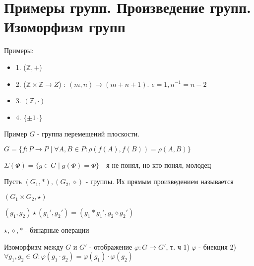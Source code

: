 
\section{Примеры групп. Произведение групп. Изоморфизм групп}
Примеры:
\begin{itemize}
\item[] 1. ($\mathbb{Z}, +$)
\item[] 2. ($\mathbb{Z}\times \mathbb{Z} \to Z$) : $(m, n) \to (m+n+1)$. $e=1, n^{-1}=n-2$
\item[] 3. $(\mathbb{Z}, \cdot)$
\item[] 4. $\{\pm 1\, \cdot \}$
\end{itemize}

Пример $G$ - группа перемещений плоскости.

$G = \{f: P \to P \mid \forall A, B \in P : \rho (f(A), f(B)) = \rho(A, B)\}$

$\Sigma(\Phi) = \{g \in G \mid g(\Phi) = \Phi\}$ - я не понял, но кто понял, молодец

\begin{conj}
    Пусть $(G_1, *), (G_2, \diamond)$ - группы. Их прямым произведением называется
    
    $(G_1\times G_2, \star)$
    
    $(g_1, g_2)\star (g_1', g_2') = (g_1*g_1', g_2\diamond g_2')$
    
$\star, \diamond, *$ - бинарные операции
\end{conj}
\begin{conj}
    Изоморфизм между $G$ и $G'$ - отображение $\varphi : G \to G'$, т. ч
        1) $\varphi$ - биекция
        2) $\forall g_1, g_2 \in G : \varphi (g_1\cdot  g_2) = \varphi (g_1)\cdot \varphi(g_2)$
\end{conj}